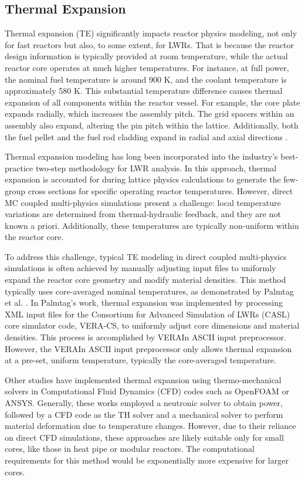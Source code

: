 \subsection{Thermal Expansion} \label{sec12}

Thermal expansion (TE) significantly impacts reactor physics modeling, not only for fast reactors but also, to some extent, for LWRs. That is because the reactor design information is typically provided at room temperature, while the actual reactor core operates at much higher temperatures. For instance, at full power, the nominal fuel temperature is around 900 K, and the coolant temperature is approximately 580 K. This substantial temperature difference causes thermal expansion of all components within the reactor vessel. For example, the core plate expands radially, which increases the assembly pitch. The grid spacers within an assembly also expand, altering the pin pitch within the lattice. Additionally, both the fuel pellet and the fuel rod cladding expand in radial and axial directions \cite{palmtag}.

Thermal expansion modeling has long been incorporated into the industry's best-practice two-step methodology for LWR analysis. In this approach, thermal expansion is accounted for during lattice physics calculations to generate the few-group cross sections for specific operating reactor temperatures. However, direct MC coupled multi-physics simulations present a challenge: local temperature variations are determined from thermal-hydraulic feedback, and they are not known a priori. Additionally, these temperatures are typically non-uniform within the reactor core.

To address this challenge, typical TE modeling in direct coupled multi-physics simulations is often achieved by manually adjusting input files to uniformly expand the reactor core geometry and modify material densities. This method typically uses core-averaged nominal temperatures, as demonstrated by Palmtag et al. \cite{palmtag}. In Palmtag's work, thermal expansion was implemented by processing XML input files for the Consortium for Advanced Simulation of LWRs (CASL) core simulator code, VERA-CS, to uniformly adjust core dimensions and material densities. This process is accomplished by VERAIn ASCII input preprocessor. However, the VERAIn ASCII input preprocessor only allows thermal expansion at a pre-set, uniform temperature, typically the core-averaged temperature.

Other studies \cite{fiorina,ma_2021,guo} have implemented thermal expansion using thermo-mechanical solvers in Computational Fluid Dynamics (CFD) codes such as OpenFOAM or ANSYS. Generally, these works employed a neutronic solver to obtain power, followed by a CFD code as the TH solver and a mechanical solver to perform material deformation due to temperature changes. However, due to their reliance on direct CFD simulations, these approaches are likely suitable only for small cores, like those in heat pipe or modular reactors. The computational requirements for this method would be exponentially more expensive for larger cores.

